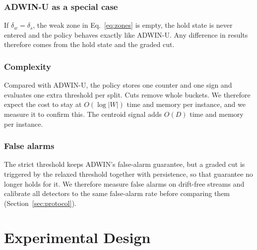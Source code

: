 \documentclass[conference]{IEEEtran}
\begin{document}
\subsubsection{ADWIN-U as a special case}
If $\delta_w=\delta_s$, the weak zone in Eq.~\eqref{eq:zones} is empty, the hold state is never entered and the policy behaves exactly like ADWIN-U. Any difference in results therefore comes from the hold state and the graded cut.

\subsubsection{Complexity}
Compared with ADWIN-U, the policy stores one counter and one sign and evaluates one extra threshold per split. Cuts remove whole buckets. We therefore expect the cost to stay at $O(\log|W|)$ time and memory per instance, and we measure it to confirm this. The centroid signal adds $O(D)$ time and memory per instance.

\subsubsection{False alarms}
The strict threshold keeps ADWIN's false-alarm guarantee, but a graded cut is triggered by the relaxed threshold together with persistence, so that guarantee no longer holds for it. We therefore measure false alarms on drift-free streams and calibrate all detectors to the same false-alarm rate before comparing them (Section~\ref{sec:protocol}).

\section{Experimental Design}
\label{sec:exp}
\end{document}
